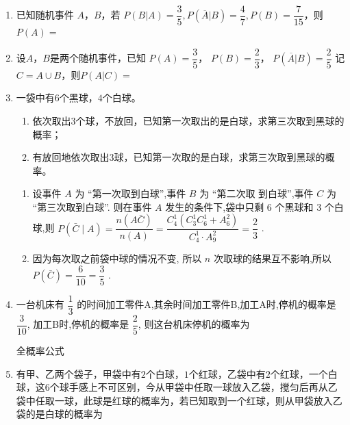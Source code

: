 \begin{enumerate}
    \item 已知随机事件 $A$，$B$，若 $P(B|A)=\dfrac{3}{5},P(\overline{A}|B)=\dfrac{4}{7},P(B)=\dfrac{7}{15}$，则$P(A)=$
    
    \item 设$A$，$B$是两个随机事件，已知 $P(A)=\dfrac{3}{5}$， $P(B)=\dfrac{2}{3}$， $P(\overline{A}|B)=\dfrac{2}{5}$ 记 $C=A\cup B$，则$P(A|C)=$
    
    \item 一袋中有$6$个黑球，$4$个白球。
    \begin{enumerate}
    \item 依次取出$3$个球，不放回，已知第一次取出的是白球，求第三次取到黑球的概率；
    \item 有放回地依次取出$3$球，已知第一次取的是白球，求第三次取到黑球的概率。
    \end{enumerate}
    \begin{jieda}
        \begin{enumerate}
            \item 设事件 $A$ 为 “第一次取到白球”,事件 $B$ 为 “第二次取
    到白球”,事件 $C$ 为 “第三次取到白球”.
    则在事件 $A$ 发生的条件下,袋中只剩 6 个黑球和 3 个白球,则 $P\left( {\bar{C} \mid  A}\right)  = \dfrac{n\left( {A\bar{C}}\right) }{n\left( A\right) } = \dfrac{{{C}}_{4}^{1}\left( {{{C}}_{3}^{1}{{C}}_{6}^{1} + {{A}}_{6}^{2}}\right) }{{{C}}_{4}^{1} \cdot  {{A}}_{9}^{2}} = \dfrac{2}{3}$ .
            \item 因为每次取之前袋中球的情况不变,
    所以 $n$ 次取球的结果互不影响,所以 $P\left( \bar{C}\right)  = \dfrac{6}{10} = \dfrac{3}{5}$ .
        \end{enumerate}
    \end{jieda}

    
    \item 一台机床有 $\dfrac{1}{3}$ 的时间加工零件A,其余时间加工零件B,加工A时,停机的概率是 $\dfrac{3}{10}$, 加工B时,停机的概率是 $\dfrac{2}{5}$, 则这台机床停机的概率为
    \begin{jieda}
        全概率公式
    \end{jieda}
    
    \item 有甲、乙两个袋子，甲袋中有$2$个白球，$1$个红球，乙袋中有$2$个红球，一个白球，这$6$个球手感上不可区别，今从甲袋中任取一球放入乙袋，搅匀后再从乙袋中任取一球，此球是红球的概率为，若已知取到一个红球，则从甲袋放入乙袋的是白球的概率为


\end{enumerate}

